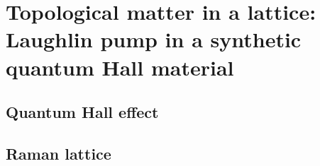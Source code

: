 
\renewcommand{\thechapter}{9}


\chapter{Topological matter in a lattice: Laughlin pump in a synthetic quantum Hall material}
\label{ch:raman_lattice}
 
\section{Quantum Hall effect}

\section{Raman lattice}










